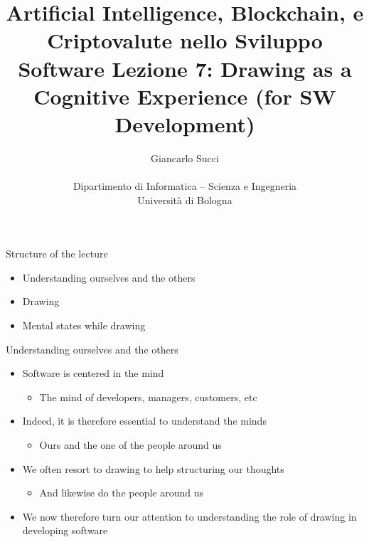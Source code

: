\documentclass{beamer}
\title[L07]{Artificial Intelligence, Blockchain, e Criptovalute nello Sviluppo Software \newline\newline
Lezione 7: Drawing as a Cognitive Experience (for SW Development)} %
\author[{\tiny Giancarlo Succi }]{Giancarlo Succi\\\\ Dipartimento di Informatica -- Scienza e Ingegneria\\Universit\`{a} di Bologna\\
\bftt{g.succi@unibo.it}
} %
\institute[unibo] %
\date{} %
\begin{document}
\begin{frame}
\titlepage %

\end{frame}





\begin{frame}
{\centerline{Structure of the lecture}}
\begin{itemize}
    \item Understanding ourselves and the others
    \item Drawing
    \item Mental states while drawing
    \end{itemize}
\end{frame}

\begin{frame}
{\centerline{Understanding ourselves and the others}}
 
\begin{itemize}
\item Software is centered in the mind
\begin{itemize}
\item The mind of developers, managers, customers, etc
\end{itemize} 
\item Indeed, it is therefore essential to understand the minds
\begin{itemize}
\item Ours and the one of the people around us
\end{itemize} 
\item We often resort to drawing to help structuring our thoughts
\begin{itemize}
\item And likewise do the people around us
\end{itemize} 
\item We now therefore turn our attention to understanding the role of drawing in developing software
\end{itemize} 

\end{frame}
\end{document}
